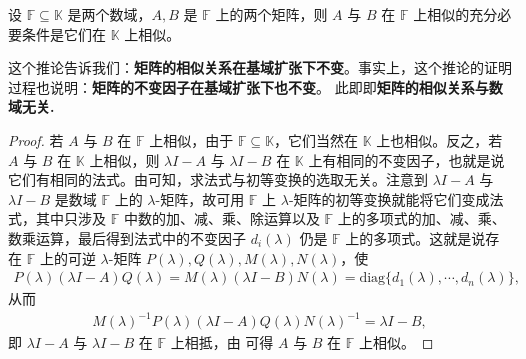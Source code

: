 \documentclass[../../main.tex]{subfiles}
\begin{document}
\begin{corollary}[矩阵的相似关系在基域扩张下不变]\label{corollary:矩阵的相似关系在基域扩张下不变}
设 $\mathbb{F}\subseteq\mathbb{K}$ 是两个数域，$A, B$ 是 $\mathbb{F}$ 上的两个矩阵，则 $A$ 与 $B$ 在 $\mathbb{F}$ 上相似的充分必要条件是它们在 $\mathbb{K}$ 上相似。
\end{corollary}
\begin{note}
这个推论告诉我们：\textbf{矩阵的相似关系在基域扩张下不变}。事实上，这个推论的证明过程也说明：\textbf{矩阵的不变因子在基域扩张下也不变}。 此即即\textbf{矩阵的相似关系与数域无关.}
\end{note}
\begin{proof}
若 $A$ 与 $B$ 在 $\mathbb{F}$ 上相似，由于 $\mathbb{F}\subseteq\mathbb{K}$，它们当然在 $\mathbb{K}$ 上也相似。反之，若 $A$ 与 $B$ 在 $\mathbb{K}$ 上相似，则 $\lambda I - A$ 与 $\lambda I - B$ 在 $\mathbb{K}$ 上有相同的不变因子，也就是说它们有相同的法式。由可知，求法式与初等变换的选取无关。注意到 $\lambda I - A$ 与 $\lambda I - B$ 是数域 $\mathbb{F}$ 上的 $\lambda$-矩阵，故可用 $\mathbb{F}$ 上 $\lambda$-矩阵的初等变换就能将它们变成法式，其中只涉及 $\mathbb{F}$ 中数的加、减、乘、除运算以及 $\mathbb{F}$ 上的多项式的加、减、乘、数乘运算，最后得到法式中的不变因子 $d_i(\lambda)$ 仍是 $\mathbb{F}$ 上的多项式。这就是说存在 $\mathbb{F}$ 上的可逆 $\lambda$-矩阵 $P(\lambda), Q(\lambda), M(\lambda), N(\lambda)$，使
\begin{align*}
P(\lambda)(\lambda I - A)Q(\lambda)=M(\lambda)(\lambda I - B)N(\lambda)=\mathrm{diag}\{d_1(\lambda),\cdots,d_n(\lambda)\},
\end{align*}
从而
\begin{align*}
M(\lambda)^{-1}P(\lambda)(\lambda I - A)Q(\lambda)N(\lambda)^{-1}=\lambda I - B,
\end{align*}
即 $\lambda I - A$ 与 $\lambda I - B$ 在 $\mathbb{F}$ 上相抵，由 可得 $A$ 与 $B$ 在 $\mathbb{F}$ 上相似。

\end{proof}
\end{document}
